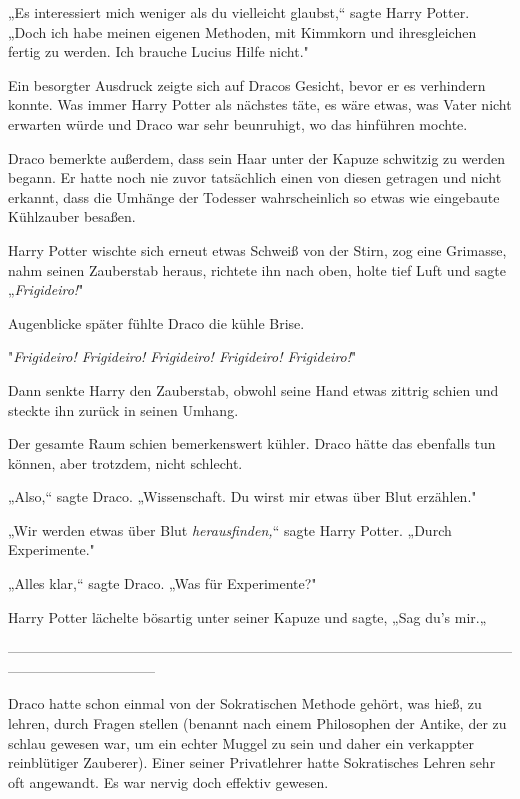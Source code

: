 {„Es interessiert mich weniger als du vielleicht glaubst,“ sagte Harry Potter. „Doch ich habe meinen eigenen Methoden, mit Kimmkorn und ihresgleichen fertig zu werden. Ich brauche Lucius Hilfe nicht."

Ein besorgter Ausdruck zeigte sich auf Dracos Gesicht, bevor er es verhindern konnte. Was immer Harry Potter als nächstes täte, es wäre etwas, was Vater nicht erwarten würde und Draco war sehr beunruhigt, wo das hinführen mochte.

Draco bemerkte außerdem, dass sein Haar unter der Kapuze schwitzig zu werden begann. Er hatte noch nie zuvor tatsächlich einen von diesen getragen und nicht erkannt, dass die Umhänge der Todesser wahrscheinlich so etwas wie eingebaute Kühlzauber besaßen.

Harry Potter wischte sich erneut etwas Schweiß von der Stirn, zog eine Grimasse, nahm seinen Zauberstab heraus, richtete ihn nach oben, holte tief Luft und sagte „\emph{Frigideiro!}"

Augenblicke später fühlte Draco die kühle Brise.

"\emph{Frigideiro! Frigideiro! Frigideiro! Frigideiro! Frigideiro!}"

Dann senkte Harry den Zauberstab, obwohl seine Hand etwas zittrig schien und steckte ihn zurück in seinen Umhang.

Der gesamte Raum schien bemerkenswert kühler. Draco hätte das ebenfalls tun können, aber trotzdem, nicht schlecht.

„Also,“ sagte Draco. „Wissenschaft. Du wirst mir etwas über Blut erzählen."

„Wir werden etwas über Blut \emph{herausfinden,}“ sagte Harry Potter. „Durch Experimente."

„Alles klar,“ sagte Draco. „Was für Experimente?"

Harry Potter lächelte bösartig unter seiner Kapuze und sagte, „Sag du's mir.„

--------------------------------------------------------------------------------------------------------------------------------------------

\hfill\break Draco hatte schon einmal von der Sokratischen Methode gehört, was hieß, zu lehren, durch Fragen stellen (benannt nach einem Philosophen der Antike, der zu schlau gewesen war, um ein echter Muggel zu sein und daher ein verkappter reinblütiger Zauberer). Einer seiner Privatlehrer hatte Sokratisches Lehren sehr oft angewandt. Es war nervig doch effektiv gewesen.

}
